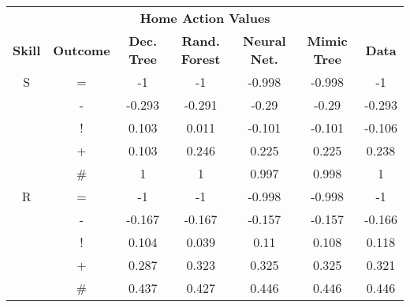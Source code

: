 \documentclass{sfuthesis}
\begin{document}
	\begin{table}
		\centering
		\begin{tabular}{ccccccc}
			\multicolumn{7}{c}{\textbf{Home Action Values}} \\
			\textbf{Skill} & \multicolumn{1}{c|}{\textbf{Outcome}} & \textbf{Dec. Tree} & \textbf{Rand. Forest} & \textbf{Neural Net.} & \multicolumn{1}{c|}{\textbf{Mimic Tree}} & \textbf{Data} \\ \hline
			S              & \multicolumn{1}{c|}{=}                & -1                 & -1                    & -0.998               & \multicolumn{1}{c|}{-0.998}              & -1            \\
			& \multicolumn{1}{c|}{-}                & -0.293             & -0.291                & -0.29                & \multicolumn{1}{c|}{-0.29}               & -0.293        \\
			& \multicolumn{1}{c|}{!}                & 0.103              & 0.011                 & -0.101               & \multicolumn{1}{c|}{-0.101}              & -0.106        \\
			& \multicolumn{1}{c|}{+}                & 0.103              & 0.246                 & 0.225                & \multicolumn{1}{c|}{0.225}               & 0.238         \\
			& \multicolumn{1}{c|}{\#}               & 1                  & 1                     & 0.997                & \multicolumn{1}{c|}{0.998}               & 1             \\ \hline
			R              & \multicolumn{1}{c|}{=}                & -1                 & -1                    & -0.998               & \multicolumn{1}{c|}{-0.998}              & -1            \\
			& \multicolumn{1}{c|}{-}                & -0.167             & -0.167                & -0.157               & \multicolumn{1}{c|}{-0.157}              & -0.166        \\
			& \multicolumn{1}{c|}{!}                & 0.104              & 0.039                 & 0.11                 & \multicolumn{1}{c|}{0.108}               & 0.118         \\
			& \multicolumn{1}{c|}{+}                & 0.287              & 0.323                 & 0.325                & \multicolumn{1}{c|}{0.325}               & 0.321         \\
			& \multicolumn{1}{c|}{\#}               & 0.437              & 0.427                 & 0.446                & \multicolumn{1}{c|}{0.446}               & 0.446         \\ \hline

\end{tabular}
\end{table}
\end{document}
